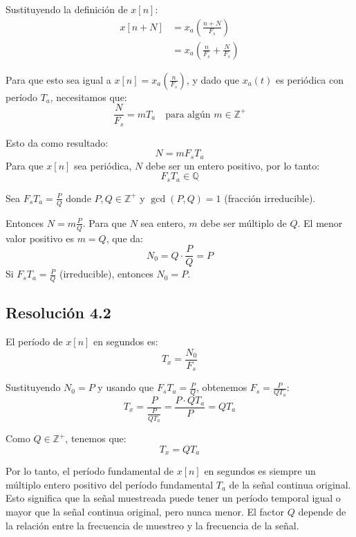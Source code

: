 \documentclass[
  11pt,
  letterpaper,
   addpoints,
  ]{exam}
\begin{document}
\begin{questions}
\begin{solution}
Sustituyendo la definición de $x[n]$:
\begin{align}
x[n+N] &= x_a\!\left(\frac{n+N}{F_s}\right) \\
&= x_a\!\left(\frac{n}{F_s} + \frac{N}{F_s}\right)
\end{align}

Para que esto sea igual a $x[n] = x_a\!\left(\frac{n}{F_s}\right)$, y dado que $x_a(t)$ es periódica con período $T_a$, necesitamos que:
\begin{equation}
\frac{N}{F_s} = mT_a \quad \text{para algún } m \in \mathbb{Z}^+
\end{equation}

Esto da como resultado:
\begin{equation}
N = mF_sT_a
\end{equation}
Para que $x[n]$ sea periódica, $N$ debe ser un entero positivo, por lo tanto:
\begin{equation}
\boxed{F_sT_a \in \mathbb{Q}}
\end{equation}

Sea $F_sT_a = \frac{P}{Q}$ donde $P, Q \in \mathbb{Z}^+$ y $\gcd(P,Q) = 1$ (fracción irreducible).

Entonces $N = m\frac{P}{Q}$. Para que $N$ sea entero, $m$ debe ser múltiplo de $Q$. El menor valor positivo es $m = Q$, que da:
\begin{equation}
\boxed{N_0 = Q \cdot \frac{P}{Q} = P}
\end{equation}
Si $F_sT_a = \frac{P}{Q}$ (irreducible), entonces $N_0 = P$.

\subsection*{Resolución 4.2}

El período de $x[n]$ en segundos es:
\begin{equation}
T_x = \frac{N_0}{F_s}
\end{equation}

Sustituyendo $N_0 = P$ y usando que $F_sT_a = \frac{P}{Q}$, obtenemos $F_s = \frac{P}{QT_a}$:
\begin{equation}
T_x = \frac{P}{\frac{P}{QT_a}} = \frac{P \cdot QT_a}{P} = QT_a
\end{equation}

Como $Q \in \mathbb{Z}^+$, tenemos que:
\begin{equation}
\boxed{T_x = QT_a}
\end{equation}

Por lo tanto, el período fundamental de $x[n]$ en segundos es siempre un múltiplo entero positivo del período fundamental $T_a$ de la señal continua original. Esto significa que la señal muestreada puede tener un período temporal igual o mayor que la señal continua original, pero nunca menor. El factor $Q$ depende de la relación entre la frecuencia de muestreo y la frecuencia de la señal.

\end{solution}

\end{questions}
\end{document}
